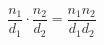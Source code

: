 \documentclass[12pt]{article}
\begin{document}
\sicpsize
\[
\frac{n_1}{d_1} \cdot \frac{n_2}{d_2} = \frac{n_1n_2}{d_1d_2}
\]
\end{document}
